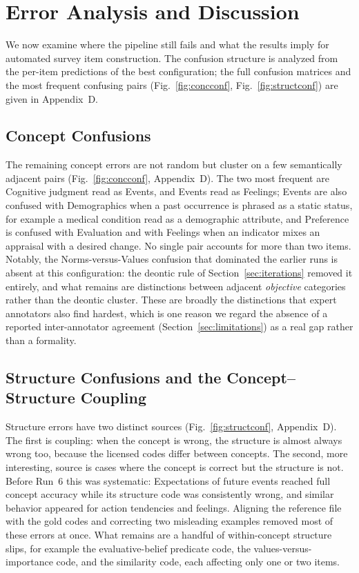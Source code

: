 \documentclass[onecolumn, 11pt]{IEEEtran}
\begin{document}
\section{Error Analysis and Discussion}
\label{sec:discussion}

We now examine where the pipeline still fails and what the results imply for automated survey item construction. The confusion structure is analyzed from the per-item predictions of the best configuration; the full confusion matrices and the most frequent confusing pairs (Fig.~\ref{fig:concconf}, Fig.~\ref{fig:structconf}) are given in Appendix~D.

\subsection{Concept Confusions}
The remaining concept errors are not random but cluster on a few semantically adjacent pairs (Fig.~\ref{fig:concconf}, Appendix~D). The two most frequent are Cognitive judgment read as Events, and Events read as Feelings; Events are also confused with Demographics when a past occurrence is phrased as a static status, for example a medical condition read as a demographic attribute, and Preference is confused with Evaluation and with Feelings when an indicator mixes an appraisal with a desired change. No single pair accounts for more than two items. Notably, the Norms-versus-Values confusion that dominated the earlier runs is absent at this configuration: the deontic rule of Section~\ref{sec:iterations} removed it entirely, and what remains are distinctions between adjacent \emph{objective} categories rather than the deontic cluster. These are broadly the distinctions that expert annotators also find hardest, which is one reason we regard the absence of a reported inter-annotator agreement (Section~\ref{sec:limitations}) as a real gap rather than a formality.



\subsection{Structure Confusions and the Concept--Structure Coupling}
Structure errors have two distinct sources (Fig.~\ref{fig:structconf}, Appendix~D). The first is coupling: when the concept is wrong, the structure is almost always wrong too, because the licensed codes differ between concepts. The second, more interesting, source is cases where the concept is correct but the structure is not. Before Run~6 this was systematic: Expectations of future events reached full concept accuracy while its structure code was consistently wrong, and similar behavior appeared for action tendencies and feelings. Aligning the reference file with the gold codes and correcting two misleading examples removed most of these errors at once. What remains are a handful of within-concept structure slips, for example the evaluative-belief predicate code, the values-versus-importance code, and the similarity code, each affecting only one or two items.
\end{document}
